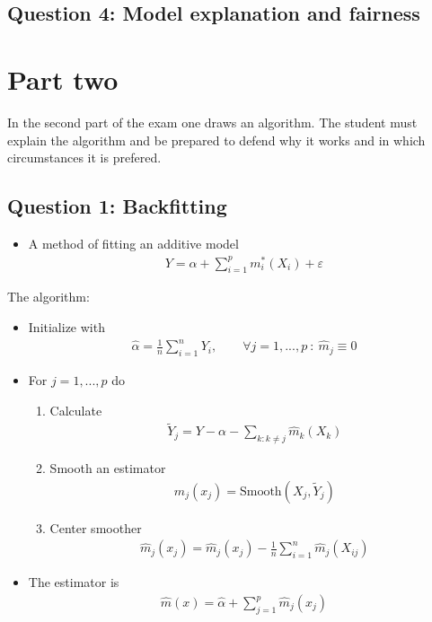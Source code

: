 \documentclass[
]{book}
\providecommand{\tightlist}{%
  \setlength{\itemsep}{0pt}\setlength{\parskip}{0pt}}
\begin{document}
\hypertarget{question-4-model-explanation-and-fairness}{%
\subsection{Question 4: Model explanation and fairness}\label{question-4-model-explanation-and-fairness}}

\hypertarget{part-two}{%
\section{Part two}\label{part-two}}

In the second part of the exam one draws an algorithm. The student must explain the algorithm and be prepared to defend why it works and in which circumstances it is prefered.

\hypertarget{question-1-backfitting}{%
\subsection{Question 1: Backfitting}\label{question-1-backfitting}}

\begin{itemize}
\tightlist
\item
  A method of fitting an additive model
  \begin{align*}
    Y=\alpha +\sum_{i=1}^pm^*_i(X_i)+\varepsilon
    \end{align*}
\end{itemize}

The algorithm:

\begin{itemize}
\tightlist
\item
  Initialize with
  \begin{align*}
    \hat \alpha = \frac{1}{n}\sum_{i=1}^n Y_i,\qquad\forall j=1,...,p\ :\ \hat m_j\equiv 0
    \end{align*}
\item
  For \(j=1,...,p\) do

  \begin{enumerate}
  \def\labelenumi{(\alph{enumi})}
  \tightlist
  \item
    Calculate
    \begin{align*}
    \tilde Y_j=Y-\alpha-\sum_{k:k\ne j}\hat m_k(X_{k})
    \end{align*}
  \item
    Smooth an estimator
    \begin{align*}
    \hat m_j(x_j)=\text{Smooth}(X_j,\tilde Y_j)
    \end{align*}
  \item
    Center smoother
    \begin{align*}
    \hat m_j(x_j)=\hat m_j(x_j)-\frac{1}{n}\sum_{i=1}^n \hat m_j(X_{ij})
    \end{align*}
  \end{enumerate}
\item
  The estimator is
  \begin{align*}
    \hat m(x)=\hat\alpha + \sum_{j=1}^p\hat m_j(x_j)
    \end{align*}
\end{itemize}
\end{document}
